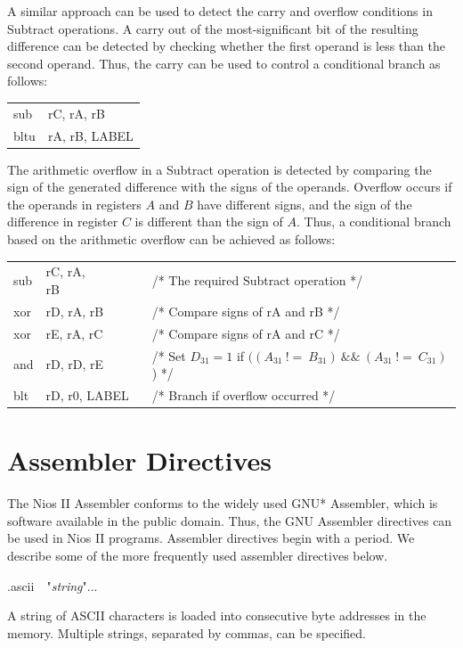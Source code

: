 \documentclass[11pt, twoside, pdftex]{article}
\begin{document}
A similar approach can be used to detect the carry and overflow conditions in Subtract operations.
A carry out of the most-significant bit of the resulting difference can be detected by checking 
whether the first operand is less than the second operand. Thus, the carry can be used to control 
a conditional branch as follows:
\begin{center}
\begin{tabular}{ll}
{\sf sub} & {\sf rC, rA, rB} \\
{\sf bltu} & {\sf rA, rB, LABEL}
\end{tabular}
\end{center}

\noindent
The arithmetic overflow in a Subtract operation is detected by comparing the sign of the generated 
difference with the signs of the operands. Overflow occurs if the operands in registers $A$ and $B$ 
have different signs, and the sign of the difference in register $C$ is different than the sign of $A$.
Thus, a conditional branch based on the arithmetic overflow can be achieved as follows:
\begin{center}
\begin{tabular}{lll}
{\sf sub} & {\sf rC, rA, rB}~~~~~~~ & /* The required Subtract operation */ \\
{\sf xor} & {\sf rD, rA, rB}  & /* Compare signs of rA and rB */ \\
{\sf xor} & {\sf rE, rA, rC}  & /* Compare signs of rA and rC */ \\
{\sf and} & {\sf rD, rD, rE}  & /* Set $D_{31} = 1$ if $((A_{31}~!=~B_{31})~\&\&~(A_{31}~!=~C_{31})$) */ \\
{\sf blt} & {\sf rD, r0, LABEL} & /* Branch if overflow occurred */
\end{tabular}
\end{center}
 

\section{Assembler Directives}

The Nios II Assembler conforms to the widely used GNU* Assembler, which is 
software available in the public domain. Thus, the GNU Assembler directives can
be used in Nios II programs. Assembler directives begin with a period. 
We describe some of the more frequently used assembler directives below.
 

\noindent
{\sf .ascii}~~"{\it string}"...
 

\noindent
A string of ASCII characters is loaded into consecutive byte addresses in the memory.
Multiple strings, separated by commas, can be specified.
 
\end{document}
